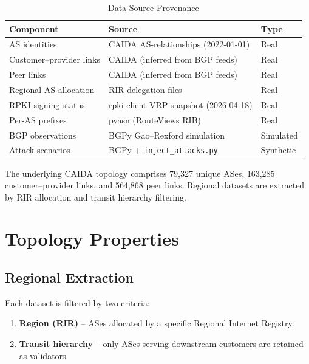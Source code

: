 \documentclass[11pt,a4paper]{article}
\begin{document}
\begin{table}[H]
\centering
\caption{Data Source Provenance}
\begin{tabular}{lll}
\toprule
\textbf{Component} & \textbf{Source} & \textbf{Type} \\
\midrule
AS identities            & CAIDA AS-relationships (2022-01-01) & Real \\
Customer--provider links & CAIDA (inferred from BGP feeds)      & Real \\
Peer links               & CAIDA (inferred from BGP feeds)      & Real \\
Regional AS allocation   & RIR delegation files                 & Real \\
RPKI signing status      & rpki-client VRP snapshot (2026-04-18)& Real \\
Per-AS prefixes          & pyasn (RouteViews RIB)               & Real \\
BGP observations         & BGPy Gao--Rexford simulation         & Simulated \\
Attack scenarios         & BGPy + \texttt{inject\_attacks.py}   & Synthetic \\
\bottomrule
\end{tabular}
\end{table}

The underlying CAIDA topology comprises 79,327 unique ASes, 163,285
customer--provider links, and 564,868 peer links. Regional datasets are
extracted by RIR allocation and transit hierarchy filtering.

\section{Topology Properties}

\subsection{Regional Extraction}

Each dataset is filtered by two criteria:
\begin{enumerate}
    \item \textbf{Region (RIR)} -- ASes allocated by a specific Regional Internet Registry.
    \item \textbf{Transit hierarchy} -- only ASes serving downstream customers are retained as validators.
\end{enumerate}
\end{document}
